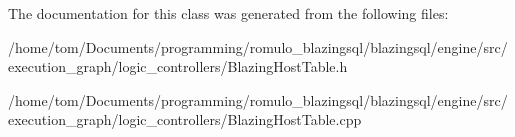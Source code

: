 The documentation for this class was generated from the following files\+:\begin{DoxyCompactItemize}
\item 
/home/tom/\+Documents/programming/romulo\+\_\+blazingsql/blazingsql/engine/src/execution\+\_\+graph/logic\+\_\+controllers/Blazing\+Host\+Table.\+h\item 
/home/tom/\+Documents/programming/romulo\+\_\+blazingsql/blazingsql/engine/src/execution\+\_\+graph/logic\+\_\+controllers/Blazing\+Host\+Table.\+cpp\end{DoxyCompactItemize}
